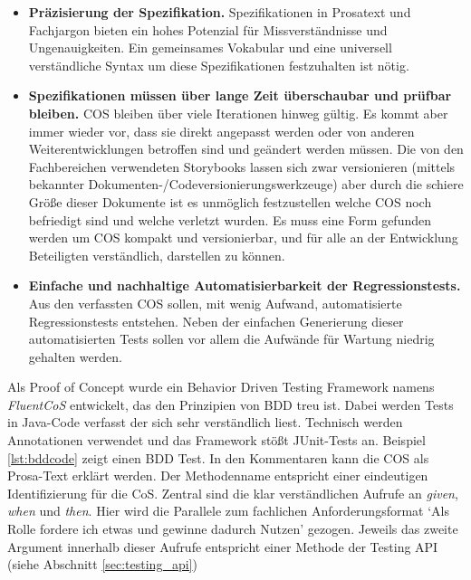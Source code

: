 \begin{itemize}
\item \textbf{Präzisierung der Spezifikation.} Spezifikationen in Prosatext und Fachjargon bieten ein hohes Potenzial für Missverständnisse und Ungenauigkeiten. Ein gemeinsames Vokabular und eine universell verständliche Syntax um diese Spezifikationen festzuhalten ist nötig.
\item \textbf{Spezifikationen müssen über lange Zeit überschaubar und prüfbar bleiben.} \Gls{COS} bleiben über viele Iterationen hinweg gültig. Es kommt aber immer wieder vor, dass sie direkt angepasst werden oder von anderen Weiterentwicklungen betroffen sind und geändert werden müssen. Die von den Fachbereichen verwendeten Storybooks lassen sich zwar versionieren (mittels bekannter Dokumenten-/Codeversionierungswerkzeuge) aber durch die schiere Größe dieser Dokumente ist es unmöglich festzustellen welche \Gls{COS} noch befriedigt sind und welche verletzt wurden. Es muss eine Form gefunden werden um \Gls{COS} kompakt und versionierbar, und für alle an der Entwicklung Beteiligten verständlich, darstellen zu können.
\item \textbf{Einfache und nachhaltige Automatisierbarkeit der Regressionstests.} Aus den verfassten \Gls{COS} sollen, mit wenig Aufwand, automatisierte Regressionstests entstehen. Neben der einfachen Generierung dieser automatisierten Tests sollen vor allem die Aufwände für Wartung niedrig gehalten werden.
\end{itemize}

Als Proof of Concept wurde ein Behavior Driven Testing Framework namens \textit{FluentCoS} entwickelt, das den Prinzipien von \Gls{BDD} treu ist. Dabei werden Tests in Java-Code verfasst der sich sehr verständlich liest. Technisch werden Annotationen verwendet und das Framework stößt JUnit-Tests an. Beispiel \ref{lst:bddcode} zeigt einen \Gls{BDD} Test. In den Kommentaren kann die \Gls{COS} als Prosa-Text erklärt werden. Der Methodenname entspricht einer eindeutigen Identifizierung für die CoS. Zentral sind die klar verständlichen Aufrufe an \textit{given}, \textit{when} und \textit{then}. Hier wird die Parallele zum fachlichen Anforderungsformat `Als Rolle fordere ich etwas und gewinne dadurch Nutzen' gezogen. Jeweils das zweite Argument innerhalb dieser Aufrufe entspricht einer Methode der Testing API (siehe Abschnitt \ref{sec:testing_api})


